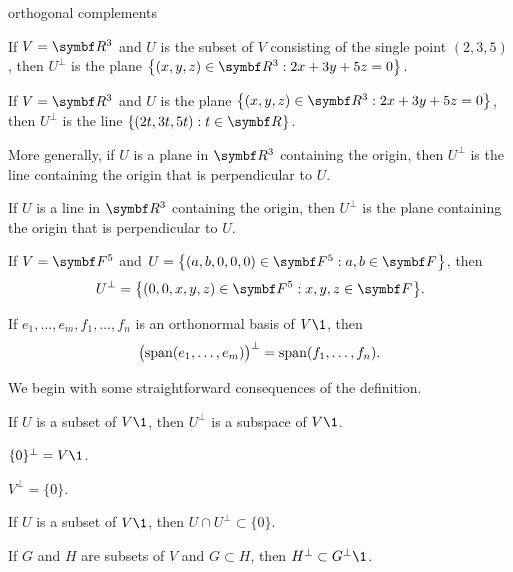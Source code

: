 \begin{example}{orthogonal complements}
\begin{Itemize}
\item
If $V = \R3$ and $U$ is the subset of $V$ consisting of the single point $(2,3,5)$, then $U^\perp$ is the plane
$\br[\big]{ (x,y,z) \in \R3: 2x+3y+5z = 0}$.
\item
If $V = \R3$ and $U$ is the plane $\br[\big]{ (x,y,z) \in \R3: 2x+3y+5z = 0}$, then $U^\perp$ is the line
$\br{ (2t, 3t, 5t): t \in \R{} }$.
\item
More generally, if $U$ is a plane in $\R3$ containing the origin, then $U^\perp$ is the line containing the origin that is perpendicular to $U$.
\item
If $U$ is a line in $\R3$ containing the origin, then $U^\perp$ is the plane containing the origin that is perpendicular to $U$.
\item
If $V = \F5$ and $U = \br[\big]{ (a,b, 0, 0, 0) \in \F5: a,b \in \F{} }$, then
\[
U^\perp = \br[\big]{(0, 0, x,y,z) \in \F5: x,y,z \in \F{}}.
\]
\item
If $e_1, \ldots, e_m, f_1, \ldots, f_n$ is an orthonormal basis of $V\1$, then
\[
\paren[\big]{\Span( e_1, \ldots, e_m)}^\perp = \Span( f_1, \ldots, f_n).
\]
\end{Itemize}
\exampleitemend
\end{example}

We begin with some straightforward consequences of the definition.

{\begin{subtheorem}
\item
If $U$ is a subset of $V\1$, then $U^\perp$ is a subspace of $V\1$.
\item
$\{0\}^\perp = V\1$.
\item
$V^\perp = \{0\}$.
\item
If $U$ is a subset of $V\1$, then $U \cap U^\perp \subset \{0\}$.
\item
If $G$ and $H$ are subsets of $V$ and $G \subset H$, then $H^\perp \subset G^\perp\1$.
\end{subtheorem}}

\pagebreak[3]

